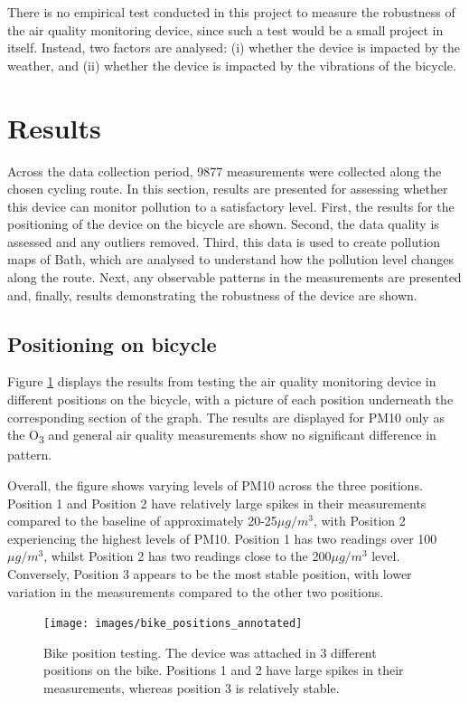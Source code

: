 \documentclass[11pt]{report}
\begin{document}
There is no empirical test conducted in this project to measure the robustness of the air quality monitoring device, since such a test would be a small project in itself. Instead, two factors are analysed: (i) whether the device is impacted by the weather, and (ii) whether the device is impacted by the vibrations of the bicycle.


\section{Results} \label{results:q1}

Across the data collection period, \num{9877} measurements were collected along the chosen cycling route. In this section, results are presented for assessing whether this device can monitor pollution to a satisfactory level. First, the results for the positioning of the device on the bicycle are shown. Second, the data quality is assessed and any outliers removed. Third, this data is used to create pollution maps of Bath, which are analysed to understand how the pollution level changes along the route. Next, any observable patterns in the measurements are presented and, finally, results demonstrating the robustness of the device are shown.

\subsection{Positioning on bicycle}

Figure \ref{fig:bike_positions_pm10} displays the results from testing the air quality monitoring device in different positions on the bicycle, with a picture of each position underneath the corresponding section of the graph. The results are displayed for PM10 only as the O\textsubscript{3} and general air quality measurements show no significant difference in pattern.

Overall, the figure shows varying levels of PM10 across the three positions. Position 1 and Position 2 have relatively large spikes in their measurements compared to the baseline of approximately 20-25$\mu g/m^3$, with Position 2 experiencing the highest levels of PM10. Position 1 has two readings over 100$\mu g/m^3$, whilst Position 2 has two readings close to the 200$\mu g/m^3$ level. Conversely, Position 3 appears to be the most stable position, with lower variation in the measurements compared to the other two positions. 

\begin{figure}[!tb]
\centering
\texttt{[image: images/bike\_positions\_annotated]}
\caption[Bike position testing.]{Bike position testing. The device was attached in 3 different positions on the bike. Positions 1 and 2 have large spikes in their measurements, whereas position 3 is relatively stable.}
\label{fig:bike_positions_pm10}
\end{figure}
\end{document}
